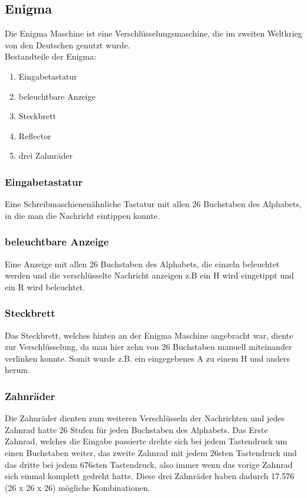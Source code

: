 \subsection{Enigma}
Die Enigma Maschine ist eine Verschlüsselungsmaschine, die im zweiten Weltkrieg von den Deutschen genutzt wurde. \\
Bestandteile der Enigma:
\begin{enumerate}
\item Eingabetastatur
\item beleuchtbare Anzeige
\item Steckbrett
\item Reflector
\item drei Zahnräder
\end{enumerate}

\subsubsection{Eingabetastatur}
Eine Schreibmaschienenähnliche Tastatur mit allen 26 Buchstaben des Alphabets, in die man die Nachricht eintippen konnte.

\subsubsection{beleuchtbare Anzeige}
Eine Anzeige mit allen 26 Buchstaben des Alphabets, die einzeln beleuchtet werden und die verschlüsselte Nachricht anzeigen z.B ein H wird eingetippt und ein R wird beleuchtet.

\subsubsection{Steckbrett}
\label{sec:steck}
Das Steckbrett, welches hinten an der Enigma Maschine angebracht war, diente zur Verschlüsselung, da man hier zehn von 26 Buchstaben manuell miteinander verlinken konnte. Somit wurde z.B. ein eingegebenes A zu einem H und anders herum.

\subsubsection{Zahnräder}
\label{sec:rader}
Die Zahnräder dienten zum weiteren Verschlüsseln der Nachrichten und jedes Zahnrad hatte 26 Stufen für jeden Buchstaben des Alphabets. Das Erste Zahnrad, welches die Eingabe passierte drehte sich bei jedem Tastendruck um einen Buchstaben weiter, das zweite Zahnrad mit jedem 26sten Tastendruck und das dritte bei jedem 676sten Tastendruck, also immer wenn das vorige Zahnrad sich einmal komplett gedreht hatte. Diese drei Zahnräder haben dadurch 17.576 (26 x 26 x 26) mögliche Kombinationen.

